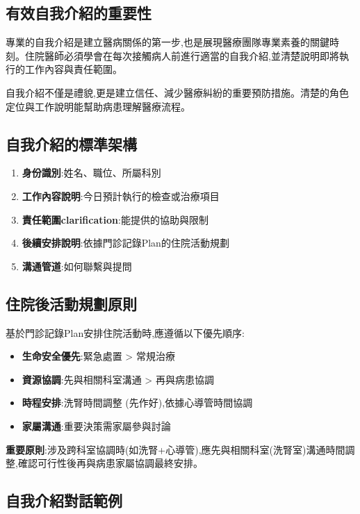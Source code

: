 \documentclass[12pt,a4paper]{article}
\newcommand{\note}[1]{
    \par
    \noindent
    \begin{tcolorbox}[
        colback=emergency_blue!5!white,
        colframe=emergency_blue,
        title=\textbf{重點提醒},
        fonttitle=\bfseries,
        boxrule=0.5pt,
        arc=3pt,
        left=6pt,
        right=6pt,
        top=6pt,
        bottom=6pt
    ]
    #1
    \end{tcolorbox}
}
\begin{document}
\subsection{有效自我介紹的重要性}
專業的自我介紹是建立醫病關係的第一步,也是展現醫療團隊專業素養的關鍵時刻。住院醫師必須學會在每次接觸病人前進行適當的自我介紹,並清楚說明即將執行的工作內容與責任範圍。

\vspace{0.5cm}
\note{
自我介紹不僅是禮貌,更是建立信任、減少醫療糾紛的重要預防措施。清楚的角色定位與工作說明能幫助病患理解醫療流程。
}

\subsection{自我介紹的標準架構}
\begin{enumerate}[nosep]
    \item \textbf{身份識別}:姓名、職位、所屬科別
    \item \textbf{工作內容說明}:今日預計執行的檢查或治療項目
    \item \textbf{責任範圍clarification}:能提供的協助與限制
    \item \textbf{後續安排說明}:依據門診記錄Plan的住院活動規劃
    \item \textbf{溝通管道}:如何聯繫與提問
\end{enumerate}

\subsection{住院後活動規劃原則}
基於門診記錄Plan安排住院活動時,應遵循以下優先順序:
\begin{itemize}[nosep]
    \item \textbf{生命安全優先}:緊急處置 > 常規治療
    \item \textbf{資源協調}:先與相關科室溝通 > 再與病患協調
    \item \textbf{時程安排}:洗腎時間調整 (先作好),依據心導管時間協調
    \item \textbf{家屬溝通}:重要決策需家屬參與討論
\end{itemize}

\begin{importantbox}
\textbf{重要原則}:涉及跨科室協調時(如洗腎+心導管),應先與相關科室(洗腎室)溝通時間調整,確認可行性後再與病患家屬協調最終安排。
\end{importantbox}

\subsection{自我介紹對話範例}
\end{document}
